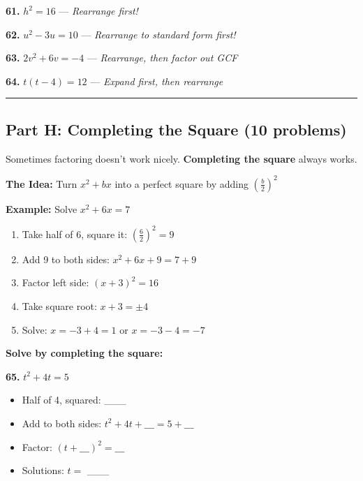 \documentclass[
  11pt,
]{article}
\providecommand{\tightlist}{%
  \setlength{\itemsep}{0pt}\setlength{\parskip}{0pt}}
\begin{document}
\textbf{61.} \(h^2 = 16\) --- \emph{Rearrange first!}

\textbf{62.} \(u^2 - 3u = 10\) --- \emph{Rearrange to standard form
first!}

\textbf{63.} \(2v^2 + 6v = -4\) --- \emph{Rearrange, then factor out
GCF}

\textbf{64.} \(t(t - 4) = 12\) --- \emph{Expand first, then rearrange}

\begin{center}\rule{0.5\linewidth}{0.5pt}\end{center}

\hypertarget{part-h-completing-the-square-10-problems}{%
\subsection{Part H: Completing the Square (10
problems)}\label{part-h-completing-the-square-10-problems}}

Sometimes factoring doesn't work nicely. \textbf{Completing the square}
always works.

\textbf{The Idea:} Turn \(x^2 + bx\) into a perfect square by adding
\(\left(\frac{b}{2}\right)^2\)

\textbf{Example:} Solve \(x^2 + 6x = 7\)

\begin{enumerate}
\def\labelenumi{\arabic{enumi}.}
\tightlist
\item
  Take half of 6, square it: \(\left(\frac{6}{2}\right)^2 = 9\)
\item
  Add 9 to both sides: \(x^2 + 6x + 9 = 7 + 9\)
\item
  Factor left side: \((x + 3)^2 = 16\)
\item
  Take square root: \(x + 3 = \pm 4\)
\item
  Solve: \(x = -3 + 4 = 1\) or \(x = -3 - 4 = -7\)
\end{enumerate}

\textbf{Solve by completing the square:}

\textbf{65.} \(t^2 + 4t = 5\)

\begin{itemize}
\tightlist
\item
  Half of 4, squared: \_\_\_
\item
  Add to both sides: \(t^2 + 4t + \_\_\_ = 5 + \_\_\_\)
\item
  Factor: \((t + \_\_\_)^2 = \_\_\_\)
\item
  Solutions: \(t ={}\) \_\_\_
\end{itemize}
\end{document}
